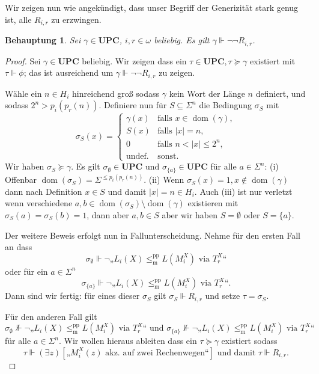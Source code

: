 \documentclass[nofonts]{uebung}
\newtheorem{claim}[theorem]{Behauptung}
\theoremstyle{definition}
\DeclareMathOperator{\dom}{dom}
\def\leqmpp{\ensuremath{\leq_\mathrm{m}^\mathrm{pp}}}
\begin{document}
Wir zeigen nun wie angekündigt, dass unser Begriff der Generizität stark genug ist, alle $R_{i,r}$ zu erzwingen.
\begin{claim}
    Sei $\gamma\in\mathbf{UPC}$, $i,r\in\omega$ beliebig. Es gilt $\gamma\Vdash\neg\neg   R_{i,r}$.
\end{claim}
\begin{proof}
    Sei $\gamma\in\mathbf{UPC}$ beliebig. Wir zeigen dass ein $\tau\in\mathbf{UPC}, \tau\succeq \gamma$ existiert mit $\tau\Vdash\phi$;
    das ist ausreichend um $\gamma\Vdash\neg\neg   R_{i,r}$ zu zeigen.

    Wähle ein $n\in H_i$ hinreichend groß sodass $\gamma$ kein Wort der Länge $n$ definiert,
    und sodass $2^n>p_i(p_r(n))$.
    Definiere nun für $S\subseteq\Sigma^n$ die Bedingung $\sigma_S$ mit
    \[ \sigma_S(x)  =\begin{cases}
    \gamma(x) & \text{falls $x\in\dom(\gamma)$},\\
    S(x) & \text{falls $|x|=n$},\\
    0 & \text{falls $n<|x|\leq 2^n$},\\
    \text{undef.} & \text{sonst}.
    \end{cases}
    \]
    Wir haben $\sigma_S\succeq \gamma$.
    Es gilt $\sigma_\emptyset\in\mathbf{UPC}$ und $\sigma_{\{a\}}\in\mathbf{UPC}$ für alle $a\in \Sigma^n$:
    (i) Offenbar $\dom(\sigma_S)=\Sigma^{\leq p_i(p_r(n))}$.
    (ii) Wenn $\sigma_S(x)=1,x\not\in\dom(\gamma)$ dann nach Definition $x\in S$ und damit $|x|=n\in H_i$.
    Auch (iii) ist nur verletzt wenn verschiedene $a,b\in\dom(\sigma_S)\setminus\dom(\gamma)$ existieren mit $\sigma_S(a)=\sigma_S(b)=1$, dann aber $a,b\in S$ aber wir haben $S=\emptyset$ oder $S=\{a\}$.

    Der weitere Beweis erfolgt nun in Fallunterscheidung. Nehme für den ersten Fall an dass
    \[ \sigma_\emptyset \Vdash \neg„L_{i}(X)\leqmpp L(M_i^X)\text{ via }T^X_r“ \]
    oder für ein $a\in\Sigma^n$
    \[ \sigma_{\{a\}} \Vdash \neg„L_{i}(X)\leqmpp L(M_i^X)\text{ via }T^X_r“. \]
    Dann sind wir fertig: für eines dieser $\sigma_S$ gilt $\sigma_S\Vdash   R_{i,r}$ und setze $\tau=\sigma_S$.

    Für den anderen Fall gilt 
    \[ \sigma_\emptyset \not\Vdash \neg„L_{i}(X)\leqmpp L(M_i^X)\text{ via }T^X_r“ \text{ und }\sigma_{\{a\}} \not\Vdash \neg„L_{i}(X)\leqmpp L(M_i^X)\text{ via }T^X_r“ \]
    für alle $a\in\Sigma^n$.
    Wir wollen hieraus ableiten dass ein $\tau\succeq\gamma$ existiert sodass
    \[ \tau\Vdash (\exists z)[\text{„$M_i^X(z)$ akz. auf zwei Rechenwegen“}] \text{ und damit } \tau\Vdash  R_{i,r}. \]


\end{proof}
\end{document}
